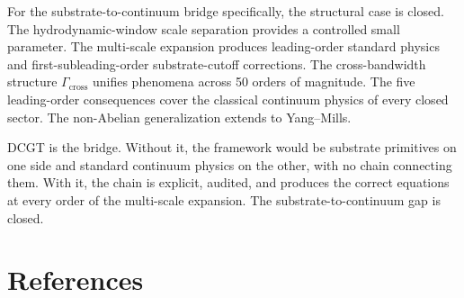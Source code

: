 \documentclass[11pt,a4paper]{article}
\begin{document}
For the substrate-to-continuum bridge specifically, the structural case is closed. The hydrodynamic-window scale separation provides a controlled small parameter. The multi-scale expansion produces leading-order standard physics and first-subleading-order substrate-cutoff corrections. The cross-bandwidth structure $\Gamma_{\mathrm{cross}}$ unifies phenomena across 50 orders of magnitude. The five leading-order consequences cover the classical continuum physics of every closed sector. The non-Abelian generalization extends to Yang--Mills.

DCGT is the bridge. Without it, the framework would be substrate primitives on one side and standard continuum physics on the other, with no chain connecting them. With it, the chain is explicit, audited, and produces the correct equations at every order of the multi-scale expansion. The substrate-to-continuum gap is closed.

\section*{References}
\end{document}
